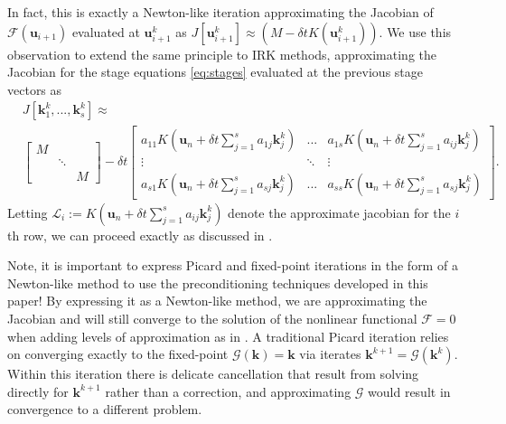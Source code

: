 \documentclass[review]{siamart}
\begin{document}
In fact, this is exactly a Newton-like iteration approximating the Jacobian of
$\mathcal{F}(\mathbf{u}_{i+1})$ evaluated at $\mathbf{u}_{i+1}^k$ as
$J[\mathbf{u}_{i+1}^k] \approx (M - \delta t K(\mathbf{u}_{i+1}^k))$. We use
this observation to extend the same principle to IRK methods, approximating
the Jacobian for the stage equations \eqref{eq:stages} evaluated at the previous
stage vectors as
%
\begin{align*}
&J[\mathbf{k}_1^{k},...,\mathbf{k}_s^k] \approx \\
&\begin{bmatrix} M \\ & \ddots & \\ && M \end{bmatrix} - \delta t
	\begin{bmatrix} a_{11}K\left(\mathbf{u}_n + \delta t\sum_{j=1}^s
	a_{1j}\mathbf{k}_j^k\right) & ... & a_{1s}K\left(\mathbf{u}_n + \delta t\sum_{j=1}^s
	a_{ij}\mathbf{k}_j^k\right) \\
	\vdots & \ddots & \vdots \\
	a_{s1}K\left(\mathbf{u}_n + \delta t\sum_{j=1}^s
	a_{sj}\mathbf{k}_j^k\right) & ... & a_{ss}K\left(\mathbf{u}_n + \delta t\sum_{j=1}^s
	a_{sj}\mathbf{k}_j^k\right)
	\end{bmatrix}.
\end{align*}
%
Letting $\mathcal{L}_i := K\left(\mathbf{u}_n + \delta t\sum_{j=1}^s
a_{ij}\mathbf{k}_j^k\right)$ denote the approximate jacobian for the
$i$th row, we can proceed exactly as discussed in .

%
\begin{remark}
Note, it is important to express Picard and fixed-point iterations in the 
form of a Newton-like method to use the preconditioning techniques developed
in this paper! By expressing it as a Newton-like method, we are approximating
the Jacobian and will still converge to the solution of the nonlinear functional
$\mathcal{F} = 0$ when adding levels of approximation as in .
A traditional Picard iteration relies on converging exactly to the fixed-point
$\mathcal{G}(\mathbf{k}) = \mathbf{k}$ via iterates $\mathbf{k}^{k+1} =
\mathcal{G}(\mathbf{k}^k)$. Within this iteration there is delicate cancellation
that result from solving directly for $\mathbf{k}^{k+1}$ rather than a correction,
and approximating $\mathcal{G}$ would result in convergence to a different problem.
\end{remark}
%
\end{document}
